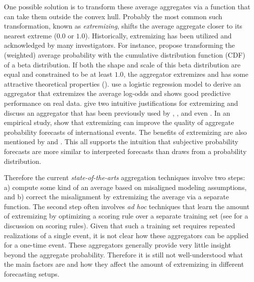 \documentclass[11pt]{article}
\theoremstyle{definition}
\theoremstyle{definition}
\begin{document}
One possible solution is to transform these average aggregates via a function that can take them outside the convex hull. Probably the most common such transformation, known as \textit{extremizing}, shifts the average aggregate closer to its nearest extreme ($0.0$ or $1.0$). Historically, extremizing has been utilized and acknowledged by many investigators. For instance, \cite{Ranjan08} propose transforming the (weighted) average probability with the cumulative distribution function (CDF) of a beta distribution. If both the shape and scale of this beta distribution are equal and constrained to be at least $1.0$,  the aggregator extremizes and has some attractive theoretical properties (\cite{Wallsten2001}). \cite{satopaa} use a logistic regression model to derive an aggregator that extremizes the average log-odds and shows good predictive performance on real data. \cite{baron2014two} give two intuitive justifications for extremizing and discuss an aggregator that has been previously used by \cite{Erev1994}, \cite{shlomi2010subjective}, and even \cite{karmarkar1978subjectively}. In an empirical study, \cite{mellers2014psychological} show that extremizing can improve the quality of aggregate probability forecasts of international events.  The benefits of extremizing are also mentioned by \cite{turner2013forecast} and \cite{Ariely00theeffects}. This all supports the intuition that subjective probability forecasts are more similar to interpreted forecasts than draws from a probability distribution. 


Therefore the current \textit{state-of-the-arts} aggregation techniques involve two steps: a) compute some kind of an average based on misaligned modeling assumptions, and b) correct the misalignment by extremizing the average via a separate function. The second step often involves \textit{ad hoc} techniques that learn the amount of extremizing by optimizing a scoring rule over a separate training set (see \cite{Gneiting04strictlyproper} for a discussion on scoring rules). Given that such a training set requires repeated realizations of a single event, it is not clear how these aggregators can be applied for a one-time event. These aggregators generally provide very little insight beyond the aggregate probability. Therefore it is still not well-understood what the main factors are and how they affect the amount of extremizing in different forecasting setups.
\end{document}
